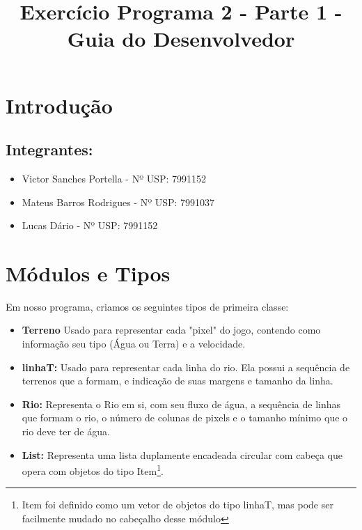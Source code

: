 \documentclass[11pt]{article}
\title{Exercício Programa 2 - Parte 1 - Guia do Desenvolvedor}
\begin{document}
\maketitle

\section{Introduç\~ao}

\begin{flushleft}
\subsection*{Integrantes:} 

\begin{itemize}
\item Victor Sanches Portella -  Nº USP: 7991152
\item Mateus Barros Rodrigues -  Nº USP: 7991037
\item Lucas Dário  -  Nº USP: 7991152
\end{itemize}

\section{Módulos e Tipos}

Em nosso programa, criamos os seguintes tipos de primeira classe:
\begin{itemize}

\item \textbf{Terreno} Usado para representar cada "pixel"
 do jogo, contendo como informação seu tipo (Água ou Terra) e
a velocidade.

\item \textbf{linhaT:} Usado para representar cada linha do
rio. Ela possui a sequência de terrenos que a formam, e indicação
de suas margens e tamanho da linha. 

\item \textbf{Rio:} Representa o Rio em si, com seu fluxo de água,
a sequência de linhas que formam o rio, o número de colunas de pixels
e o tamanho mínimo que o rio deve ter de água.

\item \textbf{List:} Representa uma lista duplamente encadeada circular
com cabeça que opera com objetos do tipo Item\footnote{Item foi definido como um vetor de objetos do tipo linhaT, mas pode ser facilmente mudado no cabeçalho desse módulo}.

\end{itemize}
\newpage


\end{flushleft}
\end{document}
